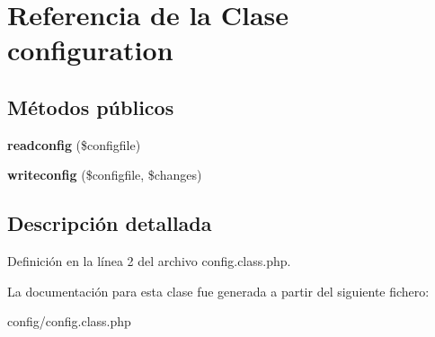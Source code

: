 \hypertarget{classconfiguration}{\section{\-Referencia de la \-Clase configuration}
\label{classconfiguration}
}
\subsection*{\-Métodos públicos}
\begin{DoxyCompactItemize}
\item 
\hypertarget{classconfiguration_a67baa5b1b19e6ab5b7d99d3704804f30}{{\bfseries readconfig} (\$configfile)}\label{classconfiguration_a67baa5b1b19e6ab5b7d99d3704804f30}

\item 
\hypertarget{classconfiguration_ac2a22ec1c4e26f015276561876d2e48f}{{\bfseries writeconfig} (\$configfile, \$changes)}\label{classconfiguration_ac2a22ec1c4e26f015276561876d2e48f}

\end{DoxyCompactItemize}


\subsection{\-Descripción detallada}


\-Definición en la línea 2 del archivo config.\-class.\-php.



\-La documentación para esta clase fue generada a partir del siguiente fichero\-:\begin{DoxyCompactItemize}
\item 
config/config.\-class.\-php\end{DoxyCompactItemize}

